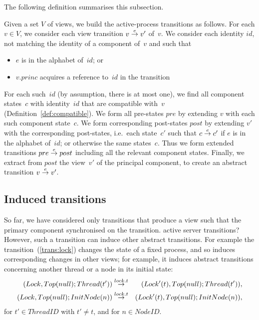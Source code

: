 The following definition summarises this subsection.
%
\begin{definition}
\label{def:active-process-transition}
Given a set $V$ of views, we build the active-process transitions as follows.
For each $v \in V$, we consider each view transition $v \stackrel{e}\rightarrow v'$ of~$v$.
We consider each identity $id$, not matching the identity of a component
of~$v$ and such that
%
\begin{itemize}
\item $e$ is in the alphabet of~$id$; or

\item $v.princ$ acquires a reference to~$id$ in the transition
\end{itemize}
%
For each such~$id$ (by assumption, there is at most one), we find all
component states~$c$ with identity~$id$ that are compatible with~$v$
(Definition~\ref{def:compatible}).  We form all pre-states $pre$ by extending
$v$ with each such component state~$c$.  We form corresponding post-states
$post$ by extending $v'$ with the corresponding post-states, i.e.\ each
state~$c'$ such that $c \stackrel{e}\rightarrow c'$ if $e$ is in the alphabet of~$id$; or
otherwise the same states~$c$.  Thus we form extended transitions $pre
\stackrel{e}\rightarrow post$ including all the relevant component states.  Finally, we
extract from $post$ the view~$v'$ of the principal component, to create an
abstract transition $v \stackrel{e}\rightarrow v'$.
\end{definition}


\subsection{Induced transitions}

So far, we have considered only transitions that produce a view such that the
primary component synchronised on the transition.   active server
transitions?  However, such a transition can induce other abstract
transitions.  For example the transition~(\ref{trans:lock}) changes the state
of a fixed process, and so induces corresponding changes in other views; for
example, it induces abstract transitions concerning another thread or a node
in its initial state:
%
\begin{eqnarray*}
(Lock, Top(null); Thread(t')) & \stackrel{lock.t}\rightarrow & 
  (Lock'(t), Top(null); Thread(t')), \\
(Lock, Top(null); InitNode(n)) & \stackrel{lock.t}\rightarrow & 
  (Lock'(t), Top(null); InitNode(n)),
\end{eqnarray*}
%
for $t' \in ThreadID$ with $t' \ne t$, and for $n \in NodeID$.

